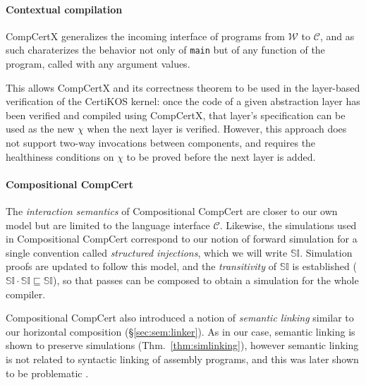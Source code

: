 \documentclass[sigplan,10pt,review,anonymous]{acmart}\settopmatter{printfolios=true,printccs=false,printacmref=false}
\begin{document}

\paragraph{Contextual compilation} %

CompCertX \cite{popl15} generalizes
the incoming interface of programs
from $\mathcal{W}$ to $\mathcal{C}$,
and as such charaterizes the behavior
not only of \texttt{main}
but of any function of the program,
called with any argument values.

This allows CompCertX and its correctness theorem
to be used in the layer-based verification of
the CertiKOS kernel:
once the code of a given abstraction layer has been verified
and compiled using CompCertX,
that layer's specification can be used as the new $\chi$
when the next layer is verified.
However,
this approach does not support two-way invocations between components,
and requires the healthiness conditions on $\chi$
to be proved before the next layer is added.


\paragraph{Compositional CompCert} %

The \emph{interaction semantics} of
Compositional CompCert \cite{compcompcert}
are closer to our own model
but are limited to the language interface $\mathcal{C}$.
Likewise, the simulations used in Compositional CompCert
correspond to our notion of forward simulation
for a single convention called \emph{structured injections},
which we will write $\mathbb{SI}$.
Simulation proofs are updated to follow this model,
and the \emph{transitivity} of $\mathbb{SI}$ is established
($\mathbb{SI} \cdot \mathbb{SI} \sqsubseteq \mathbb{SI}$),
so that passes can be composed
to obtain a simulation for the whole compiler.

Compositional CompCert also introduced a notion of \emph{semantic linking}
similar to our horizontal composition
(\S\ref{sec:sem:linker}).
As in our case,
semantic linking is shown to preserve simulations
(Thm.~\ref{thm:simlinking}),
however semantic linking is not related to
syntactic linking of assembly programs,
and this was later shown to be problematic \cite{compcertm}.
\end{document}
